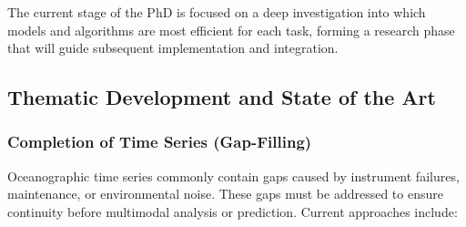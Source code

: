 \documentclass[12pt,a4paper]{article}
\begin{document}
The current stage of the PhD is focused on a deep investigation into which models and algorithms are most efficient for each task, forming a research phase that will guide subsequent implementation and integration.

\subsection{Thematic Development and State of the Art}

\subsubsection{Completion of Time Series (Gap-Filling)}
Oceanographic time series commonly contain gaps caused by instrument failures, maintenance, or environmental noise. These gaps must be addressed to ensure continuity before multimodal analysis or prediction. Current approaches include:
\end{document}
